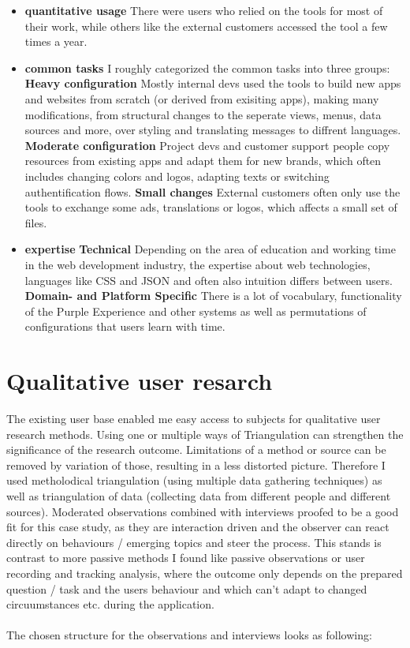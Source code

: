 \begin{itemize}
  \item \textbf{quantitative usage} There were users who relied on the tools for most of their work, while others like the external customers accessed the tool a few times a year.
  \item \textbf{common tasks} I roughly categorized the common tasks into three groups:
    \subitem \textbf{Heavy configuration} Mostly internal devs used the tools to build new apps and websites from scratch (or derived from exisiting apps), making many modifications, from structural changes to the seperate views, menus, data sources and more, over styling and translating messages to diffrent languages.
    \subitem \textbf{Moderate configuration} Project devs and customer support people copy resources from existing apps and adapt them for new brands, which often includes changing colors and logos, adapting texts or switching authentification flows.
    \subitem \textbf{Small changes} External customers often only use the tools to exchange some ads, translations or logos, which affects a small set of files.
  \item \textbf{expertise} 
    \subitem \textbf{Technical} Depending on the area of education and working time in the web development industry, the expertise about web technologies, languages like CSS and JSON and often also intuition differs between users.
    \subitem \textbf{Domain- and Platform Specific} There is a lot of vocabulary, functionality of the Purple Experience and other systems as well as permutations of configurations that users learn with time.
\end{itemize}

\section{Qualitative user resarch}

The existing user base enabled me easy access to subjects for qualitative user research methods.
Using one or multiple ways of Triangulation \cite[p. 264]{Interactiondesign:2019ys} can strengthen the significance of the research outcome. Limitations of a method or source can be removed by variation of those, resulting in a less distorted picture.
Therefore I used metholodical triangulation (using multiple data gathering techniques) as well as triangulation of data (collecting data from different people and different sources).
Moderated observations combined with interviews proofed to be a good fit for this case study, as they are interaction driven and the observer can react directly on behaviours / emerging topics and steer the process.
This stands is contrast to more passive methods I found like passive observations or user recording and tracking analysis, where the outcome only depends on the
prepared question / task and the users behaviour and which can't adapt to changed circuumstances etc. during the application.
\\\\
The chosen structure for the observations and interviews looks as following:

